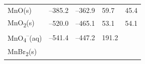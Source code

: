 \documentclass[
]{book}
\theoremstyle{definition}
\theoremstyle{definition}
\theoremstyle{definition}
\theoremstyle{remark}
\begin{document}
\begin{longtable}[]{@{}lllll@{}}
\begin{minipage}[t]{0.10\columnwidth}
MnO(s)\strut
\end{minipage} & \begin{minipage}[t]{0.19\columnwidth}\raggedright
--385.2\strut
\end{minipage} & \begin{minipage}[t]{0.20\columnwidth}\raggedright
--362.9\strut
\end{minipage} & \begin{minipage}[t]{0.18\columnwidth}\raggedright
59.7\strut
\end{minipage} & \begin{minipage}[t]{0.18\columnwidth}\raggedright
45.4\strut
\end{minipage}\tabularnewline
\begin{minipage}[t]{0.10\columnwidth}\raggedright
MnO\textsubscript{2}(s)\strut
\end{minipage} & \begin{minipage}[t]{0.19\columnwidth}\raggedright
--520.0\strut
\end{minipage} & \begin{minipage}[t]{0.20\columnwidth}\raggedright
--465.1\strut
\end{minipage} & \begin{minipage}[t]{0.18\columnwidth}\raggedright
53.1\strut
\end{minipage} & \begin{minipage}[t]{0.18\columnwidth}\raggedright
54.1\strut
\end{minipage}\tabularnewline
\begin{minipage}[t]{0.10\columnwidth}\raggedright
MnO\textsubscript{4}\textsuperscript{--}(aq)\strut
\end{minipage} & \begin{minipage}[t]{0.19\columnwidth}\raggedright
--541.4\strut
\end{minipage} & \begin{minipage}[t]{0.20\columnwidth}\raggedright
--447.2\strut
\end{minipage} & \begin{minipage}[t]{0.18\columnwidth}\raggedright
191.2\strut
\end{minipage} & \begin{minipage}[t]{0.18\columnwidth}\raggedright
\strut
\end{minipage}\tabularnewline
\begin{minipage}[t]{0.10\columnwidth}\raggedright
MnBr\textsubscript{2}(s)\strut
\end{minipage} & \begin{minipage}[t]{0.19\columnwidth}\raggedright

\end{minipage}
\end{longtable}
\end{document}
